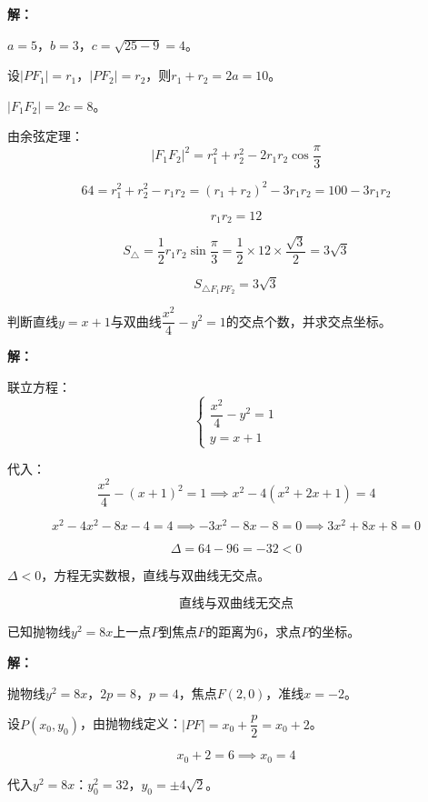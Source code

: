\documentclass[12pt, a4paper]{ctexart}
\begin{document}
\textbf{解：}

$a = 5$，$b = 3$，$c = \sqrt{25 - 9} = 4$。

设$|PF_1| = r_1$，$|PF_2| = r_2$，则$r_1 + r_2 = 2a = 10$。

$|F_1 F_2| = 2c = 8$。

由余弦定理：
$$|F_1 F_2|^2 = r_1^2 + r_2^2 - 2r_1 r_2 \cos\frac{\pi}{3}$$

$$64 = r_1^2 + r_2^2 - r_1 r_2 = (r_1 + r_2)^2 - 3r_1 r_2 = 100 - 3r_1 r_2$$

$$r_1 r_2 = 12$$

$$S_{\triangle} = \frac{1}{2} r_1 r_2 \sin\frac{\pi}{3} = \frac{1}{2} \times 12 \times \frac{\sqrt{3}}{2} = 3\sqrt{3}$$

$$\boxed{S_{\triangle F_1 P F_2} = 3\sqrt{3}}$$

\begin{examplebox}[【例题11】直线与双曲线的位置关系]
判断直线$y = x + 1$与双曲线$\dfrac{x^2}{4} - y^2 = 1$的交点个数，并求交点坐标。
\end{examplebox}

\textbf{解：}

联立方程：
$$\begin{cases} \dfrac{x^2}{4} - y^2 = 1 \\ y = x + 1 \end{cases}$$

代入：
$$\frac{x^2}{4} - (x+1)^2 = 1 \implies x^2 - 4(x^2 + 2x + 1) = 4$$

$$x^2 - 4x^2 - 8x - 4 = 4 \implies -3x^2 - 8x - 8 = 0 \implies 3x^2 + 8x + 8 = 0$$

$$\Delta = 64 - 96 = -32 < 0$$

$\Delta < 0$，方程无实数根，直线与双曲线无交点。

$$\boxed{\text{直线与双曲线无交点}}$$

\begin{examplebox}[【例题12】抛物线上的点到焦点的距离]
已知抛物线$y^2 = 8x$上一点$P$到焦点$F$的距离为$6$，求点$P$的坐标。
\end{examplebox}

\textbf{解：}

抛物线$y^2 = 8x$，$2p = 8$，$p = 4$，焦点$F(2, 0)$，准线$x = -2$。

设$P(x_0, y_0)$，由抛物线定义：$|PF| = x_0 + \dfrac{p}{2} = x_0 + 2$。

$$x_0 + 2 = 6 \implies x_0 = 4$$

代入$y^2 = 8x$：$y_0^2 = 32$，$y_0 = \pm 4\sqrt{2}$。
\end{document}
